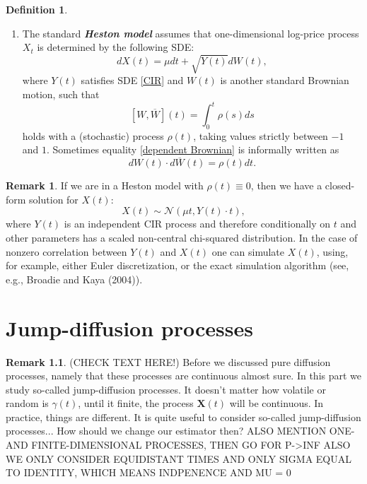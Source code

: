 \documentclass[a4paper,11pt]{book}
\theoremstyle{plain}
\theoremstyle{definition}
\newtheorem{defn}[thm]{Definition}
\newtheorem{rmrk}[thm]{Remark}
\newcommand{\define}[1]{\textit{\textbf{#1}}}
\begin{document}
\begin{defn}
\begin{enumerate}
    		\item The standard \define{Heston model} assumes that one-dimensional log-price process $X_t$ is determined by the following SDE:
    		\begin{equation}
    		dX(t) = \mu dt + \sqrt{Y(t)}d{W}(t),
    		\end{equation}
    		where $Y(t)$ satisfies SDE \eqref{CIR} and ${W}(t)$ is another standard Brownian motion, such that 
    		\begin{equation} \label{dependent Brownian}
    		[{W}, \overline{W}](t) = \int_{0}^{t}\rho(s) ds
    		\end{equation}
    		holds with a (stochastic) process $\rho(t)$, taking values strictly between $-1$ and $1$. Sometimes equality \eqref{dependent Brownian} is informally written as
    		\[ d{W}(t)\cdot d\overline{W}(t) = \rho(t) dt. \]
    	\end{enumerate}
    \end{defn}
    
    \begin{rmrk}
    	If we are in a Heston model with $\rho(t) \equiv 0$, then we have a closed-form solution for $X(t)$:
    	\[ X(t) \sim \mathcal{N}(\mu t, Y(t) \cdot t ), \]
    	where $Y(t)$ is an independent CIR process and therefore conditionally on $t$ and other parameters has a scaled non-central chi-squared distribution. In the case of nonzero correlation between $Y(t)$ and $X(t)$ one can simulate $X(t)$, using, for example, either Euler discretization, or the exact simulation algorithm (see, e.g., Broadie and Kaya (2004)).
    \end{rmrk}
    
    
    \chapter{Jump-diffusion processes}
    \begin{rmrk}
    	(CHECK TEXT HERE!)
    	Before we discussed pure diffusion processes, namely that these processes are continuous almost sure. In this part we study so-called jump-diffusion processes.
    	It doesn't matter how volatile or random is $\gamma(t)$, until it finite, the process $\mathbf{X}(t)$ will be continuous. In practice, things are different.
    	 It is quite useful to consider so-called jump-diffusion processes... How should we change our estimator then?
    	ALSO MENTION ONE- AND FINITE-DIMENSIONAL PROCESSES, THEN GO FOR P->INF
    	ALSO WE ONLY CONSIDER EQUIDISTANT TIMES
    	AND ONLY SIGMA EQUAL TO IDENTITY, WHICH MEANS INDPENENCE
    	AND MU = 0
    \end{rmrk}
    
\end{document}

